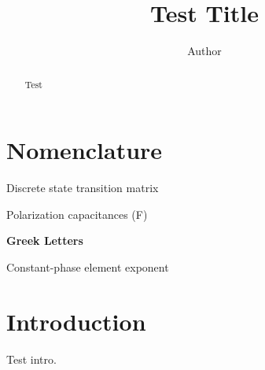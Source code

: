 \documentclass[preprint,12pt]{elsarticle}
\newcommand{\entry}[2]{\noindent\makebox[0.22\textwidth][l]{#1} \parbox[t]{0.75\textwidth}{#2}\par\vspace{2pt}}
\newcommand{\EntryHeading}[1]{\par\vspace{6pt}\noindent\textbf{#1}\par\vspace{2pt}}
\newenvironment{nomenclature}{\section*{Nomenclature}}{}
\begin{document}
\begin{frontmatter}
\title{Test Title}
\author{Author}
\begin{abstract}
Test
\end{abstract}
\end{frontmatter}

\begin{nomenclature}
\entry{$\mathbf{A}_k$}{Discrete state transition matrix}
\entry{, C_2$}{Polarization capacitances (F)}
\EntryHeading{Greek Letters}
\entry{$\alpha$}{Constant-phase element exponent}
\end{nomenclature}

\section{Introduction}
Test intro.
\end{document}
